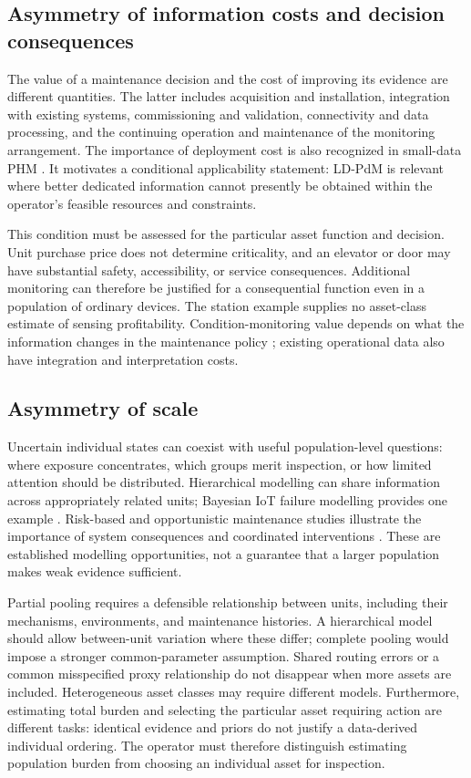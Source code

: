 \documentclass[symmetry,article,submit,pdftex,oneauthor]{Definitions/mdpi}
\begin{document}
\subsection{Asymmetry of information costs and decision consequences}

The value of a maintenance decision and the cost of improving its evidence are different quantities. The latter includes acquisition and installation, integration with existing systems, commissioning and validation, connectivity and data processing, and the continuing operation and maintenance of the monitoring arrangement. The importance of deployment cost is also recognized in small-data PHM \citep{Li2024SmallDataPHM}. It motivates a conditional applicability statement: LD-PdM is relevant where better dedicated information cannot presently be obtained within the operator's feasible resources and constraints.

This condition must be assessed for the particular asset function and decision. Unit purchase price does not determine criticality, and an elevator or door may have substantial safety, accessibility, or service consequences. Additional monitoring can therefore be justified for a consequential function even in a population of ordinary devices. The station example supplies no asset-class estimate of sensing profitability. Condition-monitoring value depends on what the information changes in the maintenance policy \citep{SrinivasanParlikad2013VoCM}; existing operational data also have integration and interpretation costs.

\subsection{Asymmetry of scale}

Uncertain individual states can coexist with useful population-level questions: where exposure concentrates, which groups merit inspection, or how limited attention should be distributed. Hierarchical modelling can share information across appropriately related units; Bayesian IoT failure modelling provides one example \citep{Baranowski2022248}. Risk-based and opportunistic maintenance studies illustrate the importance of system consequences and coordinated interventions \citep{Yeter2020,Yang2024}. These are established modelling opportunities, not a guarantee that a larger population makes weak evidence sufficient.

Partial pooling requires a defensible relationship between units, including their mechanisms, environments, and maintenance histories. A hierarchical model should allow between-unit variation where these differ; complete pooling would impose a stronger common-parameter assumption. Shared routing errors or a common misspecified proxy relationship do not disappear when more assets are included. Heterogeneous asset classes may require different models. Furthermore, estimating total burden and selecting the particular asset requiring action are different tasks: identical evidence and priors do not justify a data-derived individual ordering. The operator must therefore distinguish estimating population burden from choosing an individual asset for inspection.
\end{document}
